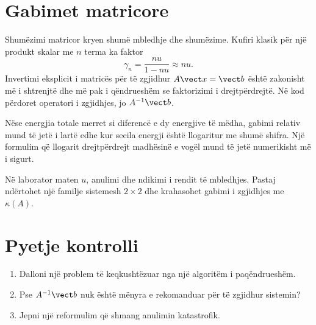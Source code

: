 \section{Gabimet matricore}
Shumëzimi matricor kryen shumë mbledhje dhe shumëzime. Kufiri klasik për një produkt skalar me $n$ terma ka faktor
\begin{equation}
 \gamma_n=\frac{nu}{1-nu}\approx nu.
\end{equation}
Invertimi eksplicit i matricës për të zgjidhur $A\vect x=\vect b$ është zakonisht më i shtrenjtë dhe më pak i qëndrueshëm se faktorizimi i drejtpërdrejtë. Në kod përdoret operatori i zgjidhjes, jo $A^{-1}\vect b$.

\begin{shembull}
Nëse energjia totale merret si diferencë e dy energjive të mëdha, gabimi relativ mund të jetë i lartë edhe kur secila energji është llogaritur me shumë shifra. Një formulim që llogarit drejtpërdrejt madhësinë e vogël mund të jetë numerikisht më i sigurt.
\end{shembull}

\begin{lidhje}
Në laborator maten $u$, anulimi dhe ndikimi i rendit të mbledhjes. Pastaj ndërtohet një familje sistemesh $2\times2$ dhe krahasohet gabimi i zgjidhjes me $\kappa(A)$.
\end{lidhje}

\section*{Pyetje kontrolli}
\begin{enumerate}
\item Dalloni një problem të keqkushtëzuar nga një algoritëm i paqëndrueshëm.
\item Pse $A^{-1}\vect b$ nuk është mënyra e rekomanduar për të zgjidhur sistemin?
\item Jepni një reformulim që shmang anulimin katastrofik.
\end{enumerate}



